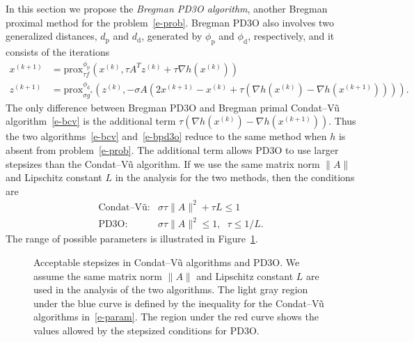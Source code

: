 \documentclass[letterpaper,11pt]{article}
\newcommand{\prox}{\mathrm{prox}}
\newcommand{\primal}{\mathrm p}
\newcommand{\dual}{\mathrm d}
\begin{document}
In this section we propose the \emph{Bregman PD3O algorithm},
another Bregman proximal method for the problem~\eqref{e-prob}.
Bregman PD3O also involves two generalized distances,
$d_\primal$ and $d_\dual$, generated by $\phi_\primal$ and $\phi_\dual$,
respectively, and it consists of the iterations
\begin{subequations} \label{e-bpd3o}
\begin{align}
  x^{(k+1)} &= \prox^{\phi_\primal}_{\tau f}
    (x^{(k)},\tau A^Tz^{(k)}+\tau\nabla h(x^{(k)})) \\
  z^{(k+1)} &= \prox^{\phi_\dual}_{\sigma g^\ast} (z^{(k)},
    -\sigma A(2x^{(k+1)}-x^{(k)}
    +\tau (\nabla h(x^{(k)})-\nabla h(x^{(k+1)})) ) ).
\end{align}
\end{subequations}
The only difference between Bregman PD3O and Bregman primal Condat--V\~u 
algorithm~\eqref{e-bcv} is the additional term
$\tau (\nabla h(x^{(k)})-\nabla h(x^{(k+1)}) )$.
Thus the two algorithms~\eqref{e-bcv} and~\eqref{e-bpd3o} reduce to
the same method when $h$ is absent from problem~\eqref{e-prob}.
The additional term allows PD3O to use larger stepsizes than 
the Condat--V\~u algorithm.
If we use the same matrix norm $\|A\|$ and Lipschitz constant $L$ in
the analysis for the two methods, then the conditions are
\begin{equation} \label{e-param}
  \begin{array}{ll}
    \mbox{Condat--V\~u:} & \sigma \tau \|A\|^2 + \tau L \leq 1 \\
    \mbox{PD3O:} & \sigma \tau \|A\|^2 \leq 1, \;\; \tau \leq 1/L.
  \end{array}
\end{equation}
The range of possible parameters is illustrated in Figure~\ref{f-param-1}.
\begin{figure}
\centering
{}
\caption{Acceptable stepsizes in Condat--V\~u algorithms and PD3O.
We assume the same matrix norm $\|A\|$ and Lipschitz constant $L$
are used in the analysis of the two algorithms.
The light gray region under the blue curve is defined by the 
inequality for the Condat--V\~u algorithms in~\eqref{e-param}.
The region under the red curve shows the values allowed 
by the stepsized conditions for PD3O.
}
\label{f-param-1}
\end{figure}
\end{document}
